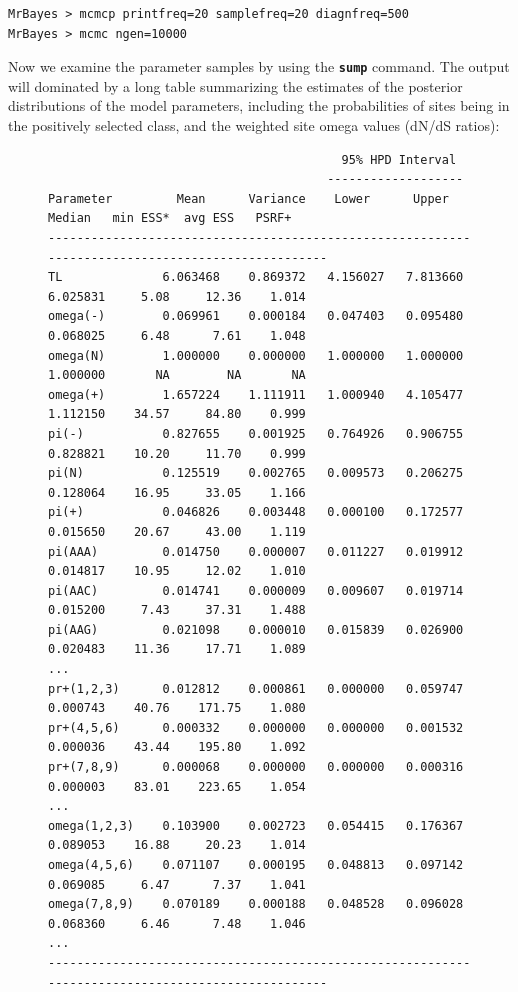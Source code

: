 \documentclass[12pt]{book}
\newcommand{\ttt}[1]{\texttt{#1}}
\newcommand{\tb}[1]{\ttt{\textbf{#1}}}
\begin{document}
\begin{singlespacing}
\small
\begin{verbatim}
MrBayes > mcmcp printfreq=20 samplefreq=20 diagnfreq=500
MrBayes > mcmc ngen=10000
\end{verbatim}
\normalsize
\end{singlespacing}

Now we examine the parameter samples by using the \tb{sump} command. The output will dominated by a
long table summarizing the estimates of the posterior distributions of the model parameters,
including the probabilities of sites being in the positively selected class, and the weighted site
omega values (dN/dS ratios):

\begin{figure}[h]\singlespacing\scriptsize
\begin{verbatim}
                                         95% HPD Interval
                                       -------------------
Parameter         Mean      Variance    Lower      Upper       Median   min ESS*  avg ESS   PSRF+ 
--------------------------------------------------------------------------------------------------
TL              6.063468    0.869372   4.156027   7.813660    6.025831     5.08     12.36    1.014
omega(-)        0.069961    0.000184   0.047403   0.095480    0.068025     6.48      7.61    1.048
omega(N)        1.000000    0.000000   1.000000   1.000000    1.000000       NA        NA       NA   
omega(+)        1.657224    1.111911   1.000940   4.105477    1.112150    34.57     84.80    0.999
pi(-)           0.827655    0.001925   0.764926   0.906755    0.828821    10.20     11.70    0.999
pi(N)           0.125519    0.002765   0.009573   0.206275    0.128064    16.95     33.05    1.166
pi(+)           0.046826    0.003448   0.000100   0.172577    0.015650    20.67     43.00    1.119
pi(AAA)         0.014750    0.000007   0.011227   0.019912    0.014817    10.95     12.02    1.010
pi(AAC)         0.014741    0.000009   0.009607   0.019714    0.015200     7.43     37.31    1.488
pi(AAG)         0.021098    0.000010   0.015839   0.026900    0.020483    11.36     17.71    1.089
...
pr+(1,2,3)      0.012812    0.000861   0.000000   0.059747    0.000743    40.76    171.75    1.080
pr+(4,5,6)      0.000332    0.000000   0.000000   0.001532    0.000036    43.44    195.80    1.092
pr+(7,8,9)      0.000068    0.000000   0.000000   0.000316    0.000003    83.01    223.65    1.054
...
omega(1,2,3)    0.103900    0.002723   0.054415   0.176367    0.089053    16.88     20.23    1.014
omega(4,5,6)    0.071107    0.000195   0.048813   0.097142    0.069085     6.47      7.37    1.041
omega(7,8,9)    0.070189    0.000188   0.048528   0.096028    0.068360     6.46      7.48    1.046
...
--------------------------------------------------------------------------------------------------
\end{verbatim}\end{figure}
\end{document}
